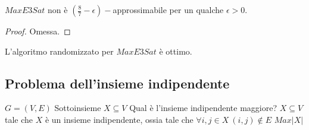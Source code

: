 \begin{theorem}
	$MaxE3Sat$ non è $(\frac{8}{7} - \epsilon)-$approssimabile per un qualche $\epsilon > 0$.
\end{theorem}
\begin{proof}
	Omessa.
\end{proof}
\begin{corollario}
	L'algoritmo randomizzato per $MaxE3Sat$ è ottimo.
\end{corollario}

\subsection{Problema dell'insieme indipendente}
 {$G = (V,E)$} {Sottoinsieme $X \subseteq V$}
{Qual è l'insieme indipendente maggiore?}
{
	$X \subseteq V$ tale che $X$ è un insieme indipendente, ossia
	tale che $\forall i,j \in X ~ (i,j) \notin E$
}
{$Max$}{$|X|$}

